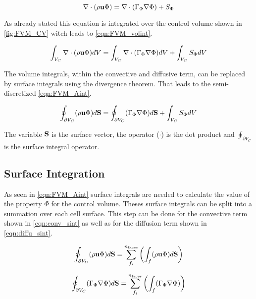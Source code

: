 \documentclass[../thesis.tex]{subfiles}
\begin{document}
\begin{equation}
	\nabla \cdot (\rho \bold{u} \Phi) = \nabla \cdot (\Gamma_\Phi \nabla \Phi) + S_\Phi
\end{equation}

As already stated this equation is integrated over the control volume shown in \autoref{fig:FVM_CV} witch leads to \autoref{eqn:FVM_volint}.

\begin{equation}
	\label{eqn:FVM_volint}
	\int_{V_C} \nabla \cdot (\rho \bold{u} \Phi) dV = \int_{V_C} \nabla \cdot (\Gamma_\Phi \nabla \Phi) dV + \int_{V_C} S_\Phi dV
\end{equation}

The volume integrals, within the convective and diffusive term, can be replaced by surface integrals using the divergence theorem. That leads to the semi-discretized \autoref{eqn:FVM_Aint}.

\begin{equation}
	\label{eqn:FVM_Aint}
	\oint_{\partial V_C} (\rho \bold{u} \Phi) d\bold{S} = \oint_{\partial V_C} (\Gamma_\Phi \nabla \Phi) d\bold{S} + \int_{V_C} S_\Phi dV
\end{equation}

The variable $ \bold{S}$ is the surface vector, the operator ($\cdot$) is the dot product and $ \oint_{\partial V_C}$ is the surface integral operator.

\subsection{Surface Integration}

As seen in \autoref{eqn:FVM_Aint} surface integrals are needed to calculate the value of the property $\Phi$ for the control volume. Theses surface integrals can be split into a summation over each cell surface. This step can be done for the convective term shown in \autoref{eqn:conv_sint} as well as for the diffusion term shown in \autoref{eqn:diffu_sint}.

\begin{equation}
	\label{eqn:conv_sint}
	\oint_{\partial V_C} (\rho \bold{u} \Phi) d\bold{S} = \sum_{f_i}^{n_{\text{faces}}}\left( \int_{f} (\rho \bold{u} \Phi) d\bold{S} \right)
\end{equation}

\begin{equation}
	\label{eqn:diffu_sint}
	\oint_{\partial V_C} (\Gamma_\Phi \nabla \Phi) d\bold{S} =  \sum_{f_i}^{n_{\text{faces}}}\left( \int_{f} (\Gamma_\Phi \nabla \Phi) \right)
\end{equation} 
\end{document}
